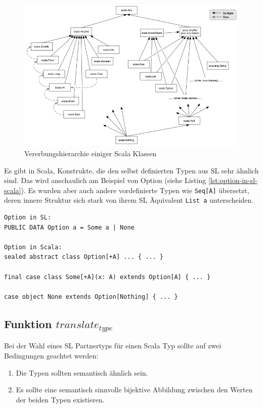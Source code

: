 \documentclass[12pt]{scrreprt}
\begin{document}
\begin{figure}[h] 
  \centering
     \includegraphics[width=\textwidth]{Bilder/classhierarchy}
  \caption{Vererbungshierarchie einiger Scala Klassen \cite{UnbekannterAutor2013}}
  \label{fig:classhierarchy}
\end{figure}

Es gibt in Scala, Konstrukte, die den selbst definierten Typen aus \ac{SL} sehr ähnlich sind. Das wird anschaulich am Beispiel von Option (siehe Listing \ref{lst:option-in-sl-scala}). Es wurden aber auch andere vordefinierte Typen wie \lstinline!Seq[A]! übersetzt, deren innere Struktur sich stark von ihrem SL Äquivalent \lstinline!List a! unterscheiden.

\begin{lstlisting}[caption=Option in \ac{SL} und Scala, label=lst:option-in-sl-scala, float=h]
Option in SL:
PUBLIC DATA Option a = Some a | None

Option in Scala:
sealed abstract class Option[+A] ... { ... }

final case class Some[+A](x: A) extends Option[A] { ... }

case object None extends Option[Nothing] { ... }
\end{lstlisting}

\subsection{Funktion $translate_{type}$}
\label{subsec:translate_type}

Bei der Wahl eines SL Partnertyps für einen Scala Typ sollte auf zwei Bedingungen geachtet werden:

\begin{enumerate}
 \item{Die Typen sollten semantisch ähnlich sein.}
 \item{Es sollte eine semantisch sinnvolle bijektive Abbildung zwischen den Werten der beiden Typen existieren. }
\end{enumerate}
\end{document}
